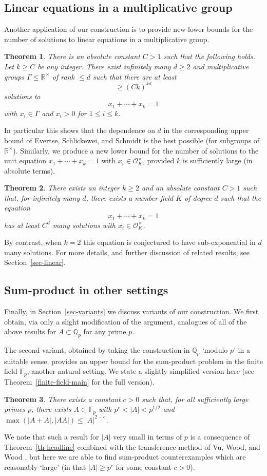\documentclass{amsart}
\numberwithin{equation}{section}
\newcommand{\bbq}{\mathbb{Q}}
\newcommand{\abs}[1]{\mathopen{}\left| #1\mathclose{}\right|}
\newcommand{\bbr}{\mathbb{R}}
\newcommand{\bbf}{\mathbb{F}}
\newtheorem{theorem}{Theorem}[section]
\begin{document}
\subsection{Linear equations in a multiplicative group}
Another application of our construction is to provide new lower bounds for the number of solutions to linear equations in a multiplicative group.
\begin{theorem}\label{th-linearmain}
There is an absolute constant $C>1$ such that the following holds. Let $k\geq C$ be any integer. There exist infinitely many $d\geq 2$ and multiplicative groups $\Gamma\leq\bbr^\times$ of rank $\leq d$ such that there are at least
\[\geq (Ck)^{kd}\]
solutions to
\[x_1+\cdots+x_k=1\]
with $x_i\in \Gamma$ and $x_i>0$ for $1\leq i\leq k$.
\end{theorem}
In particular this shows that the dependence on $d$ in the corresponding upper bound of Evertse, Schlickewei, and Schmidt \cite{ESS02} is the best possible (for subgroups of $\bbr^\times$). Similarly, we produce a new lower bound for the number of solutions to the unit equation $x_1+\cdots+x_k=1$ with $x_i\in \mathcal{O}_K^\times$, provided $k$ is sufficiently large (in absolute terms).
\begin{theorem}\label{th-unitlower}
There exists an integer $k\geq 2$ and an absolute constant $C>1$ such that, for infinitely many $d$, there exists a number field $K$ of degree $d$ such that the equation
\[x_1+\cdots+x_k=1\]
has at least $C^d$ many solutions with $x_i\in \mathcal{O}_K^\times$.
\end{theorem}
By contrast, when $k=2$ this equation is conjectured to have sub-exponential in $d$ many solutions. For more details, and further discussion of related results, see Section~\ref{sec-linear}.

\subsection{Sum-product in other settings}
Finally, in Section~\ref{sec-variants} we discuss variants of our construction. We first obtain, via only a slight modification of the argument, analogues of all of the above results for $A\subset \bbq_p$ for any prime $p$. 

The second variant, obtained by taking the construction in $\bbq_p$ `modulo $p$' in a suitable sense, provides an upper bound for the sum-product problem in the finite field $\bbf_p$, another natural setting. We state a slightly simplified version here (see Theorem~\ref{finite-field-main} for the full version).
\begin{theorem}
There exists a constant $c>0$ such that, for all sufficiently large primes $p$, there exists $A \subset \mathbb F_p$ with $p^{c}< \abs{A} < p^{1/2}$ and $\max(\abs{A+A},\abs{AA})\leq \abs{A}^{2-c}$. \end{theorem}
We note that such a result for $\abs{A}$ very small in terms of $p$ is a consequence of Theorem~\ref{th-headline} combined with the transference method of Vu, Wood, and Wood \cite{VWW11}, but here we are able to find sum-product counterexamples which are reasonably `large' (in that $\abs{A}\geq p^c$ for some constant $c>0$).
\end{document}
